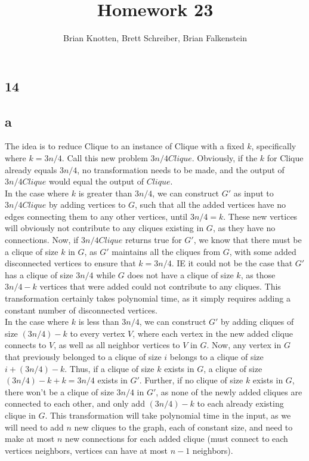 \documentclass[letterpaper,notitlepage,twoside]{article}
\begin{document}
\title{Homework 23}
\author{Brian Knotten, Brett Schreiber, Brian Falkenstein}
\maketitle
\subsection*{14}
\subsection*{a}
The idea is to reduce Clique to an instance of Clique with a fixed $k$, specifically where $k=3n/4$. Call this new problem $3n/4Clique$. Obviously, if the $k$ for Clique already equals $3n/4$, no transformation needs to be made, and the output of $3n/4Clique$ would equal the output of $Clique$. \\
In the case where $k$ is greater than $3n/4$, we can construct $G'$ as input to  $3n/4Clique$ by adding vertices to $G$, such that all the added vertices have no edges connecting them to any other vertices, until $3n/4 = k$. These new vertices will obviously not contribute to any cliques existing in $G$, as they have no connections. 
Now, if $3n/4Clique$ returns true for $G'$, we know that there must be a clique of size $k$ in $G$, as $G'$ maintains all the cliques from $G$, with some added disconnected vertices to ensure that $k=3n/4$. IE it could not be the case that $G'$ has a clique of size $3n/4$ while $G$ does not have a clique of size $k$, as those $3n/4 -k$ vertices that were added could not contribute to any cliques. This transformation certainly takes polynomial time, as it simply requires adding a constant number of disconnected vertices.\\
In the case where $k$ is less than $3n/4$, we can construct $G'$ by adding cliques of size $(3n/4) - k$ to every vertex $V$, where each vertex in the new added clique connects to $V$, as well as all neighbor vertices to $V$ in $G$. Now, any vertex in $G$ that previously belonged to a clique of size $i$ belongs to a clique of size $i + (3n/4) - k$. Thus, if a clique of size $k$ exists in $G$, a clique of size $(3n/4) - k + k = 3n/4$ exists in $G'$. Further, if no clique of size $k$ exists in $G$, there won't be a clique of size $3n/4$ in $G'$, as none of the newly added cliques are connected to each other, and only add $(3n/4) - k$ to each already existing clique in $G$. This transformation will take polynomial time in the input, as we will need to add $n$ new cliques to the graph, each of constant size, and need to make at most $n$ new connections for each added clique (must connect to each vertices neighbors, vertices can have at most $n-1$ neighbors). 
\end{document}
